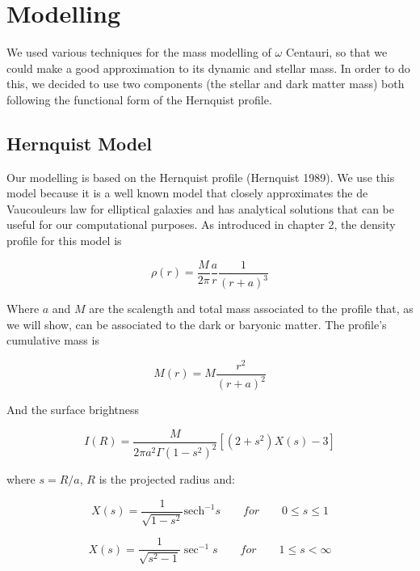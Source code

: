 \chapter{Modelling}

We used various techniques for the mass modelling of $\omega$ Centauri, so that we could make a good approximation to its dynamic and stellar mass. In order to do this, we decided to use two components (the stellar and dark matter mass) both following the functional form of the Hernquist profile.  

\section{Hernquist Model}

Our modelling is based on the Hernquist profile (Hernquist 1989).  We use this model because it is a well known model that closely approximates the de Vaucouleurs law for elliptical galaxies and has analytical solutions that can be useful for our computational purposes. As introduced in chapter 2, the density profile for this model is

\begin{equation}
\rho(r)=\frac{M}{2\pi}\frac{a}{r}\frac{1}{\left(r+a\right)^{3}}
\end{equation}

Where $a$ and $M$ are the scalength and total mass associated to the profile that, as we will show, can be associated to the dark or baryonic matter. The profile's cumulative mass is

\begin{equation}
M(r)=M\frac{r^{2}}{(r+a)^{2}}
\end{equation}
 
And the surface brightness 
 
 \begin{equation}
 I(R)=\frac{M}{2\pi a^{2}\Gamma\left(1-s^{2}\right)^{2}}\left[\left(2+s^{2}\right)X(s)-3\right]
 \end{equation}
 
where $s=R/a$, $R$ is the projected radius and:

\begin{equation}
X(s)=\frac{1}{\sqrt{1-s^{2}}}\text{sech}^{-1}s \qquad for\qquad0\leq s\leq1
\end{equation}

\begin{equation}
X(s)=\frac{1}{\sqrt{s^{2}-1}}\sec^{-1}s\qquad for\qquad1\leq s<\infty
\end{equation}

